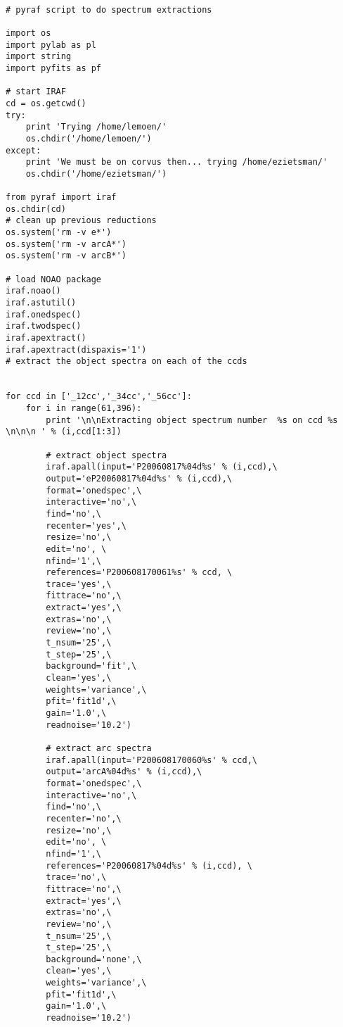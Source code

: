 \begin{footnotesize}
 


\begin{verbatim}
 
# pyraf script to do spectrum extractions

import os
import pylab as pl
import string
import pyfits as pf

# start IRAF
cd = os.getcwd()
try:
    print 'Trying /home/lemoen/'
    os.chdir('/home/lemoen/')
except:
    print 'We must be on corvus then... trying /home/ezietsman/'
    os.chdir('/home/ezietsman/')
    
from pyraf import iraf
os.chdir(cd)
# clean up previous reductions
os.system('rm -v e*')
os.system('rm -v arcA*')
os.system('rm -v arcB*')

# load NOAO package
iraf.noao()
iraf.astutil()
iraf.onedspec()
iraf.twodspec()
iraf.apextract()
iraf.apextract(dispaxis='1')
# extract the object spectra on each of the ccds


for ccd in ['_12cc','_34cc','_56cc']:
    for i in range(61,396):
        print '\n\nExtracting object spectrum number  %s on ccd %s \n\n\n ' % (i,ccd[1:3])
        
        # extract object spectra
        iraf.apall(input='P20060817%04d%s' % (i,ccd),\
        output='eP20060817%04d%s' % (i,ccd),\
        format='onedspec',\
        interactive='no',\
        find='no',\
        recenter='yes',\
        resize='no',\
        edit='no', \
        nfind='1',\
        references='P200608170061%s' % ccd, \
        trace='yes',\
        fittrace='no',\
        extract='yes',\
        extras='no',\
        review='no',\
        t_nsum='25',\
        t_step='25',\
        background='fit',\
        clean='yes',\
        weights='variance',\
        pfit='fit1d',\
        gain='1.0',\
        readnoise='10.2')
        
        # extract arc spectra
        iraf.apall(input='P200608170060%s' % ccd,\
        output='arcA%04d%s' % (i,ccd),\
        format='onedspec',\
        interactive='no',\
        find='no',\
        recenter='no',\
        resize='no',\
        edit='no', \
        nfind='1',\
        references='P20060817%04d%s' % (i,ccd), \
        trace='no',\
        fittrace='no',\
        extract='yes',\
        extras='no',\
        review='no',\
        t_nsum='25',\
        t_step='25',\
        background='none',\
        clean='yes',\
        weights='variance',\
        pfit='fit1d',\
        gain='1.0',\
        readnoise='10.2')
        

\end{verbatim}
\end{footnotesize}
